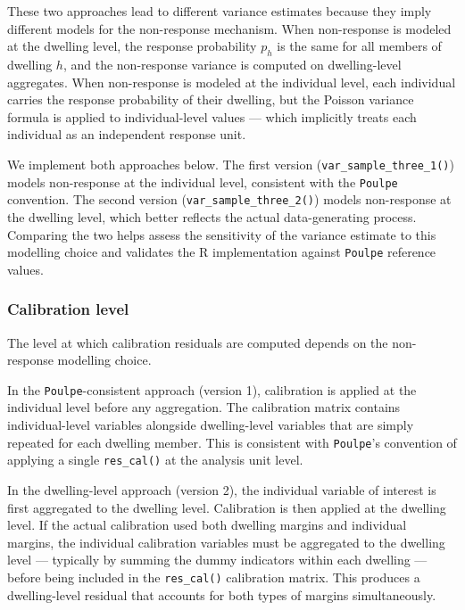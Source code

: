 \documentclass[
]{article}
\begin{document}
These two approaches lead to different variance estimates because they
imply different models for the non-response mechanism. When non-response
is modeled at the dwelling level, the response probability \(p_h\) is
the same for all members of dwelling \(h\), and the non-response
variance is computed on dwelling-level aggregates. When non-response is
modeled at the individual level, each individual carries the response
probability of their dwelling, but the Poisson variance formula is
applied to individual-level values --- which implicitly treats each
individual as an independent response unit.

We implement both approaches below. The first version
(\texttt{var\_sample\_three\_1()}) models non-response at the individual
level, consistent with the \texttt{Poulpe} convention. The second
version (\texttt{var\_sample\_three\_2()}) models non-response at the
dwelling level, which better reflects the actual data-generating
process. Comparing the two helps assess the sensitivity of the variance
estimate to this modelling choice and validates the R implementation
against \texttt{Poulpe} reference values.

\subsubsection{Calibration level}\label{calibration-level}

The level at which calibration residuals are computed depends on the
non-response modelling choice.

In the \texttt{Poulpe}-consistent approach (version 1), calibration is
applied at the individual level before any aggregation. The calibration
matrix contains individual-level variables alongside dwelling-level
variables that are simply repeated for each dwelling member. This is
consistent with \texttt{Poulpe}'s convention of applying a single
\texttt{res\_cal()} at the analysis unit level.

In the dwelling-level approach (version 2), the individual variable of
interest is first aggregated to the dwelling level. Calibration is then
applied at the dwelling level. If the actual calibration used both
dwelling margins and individual margins, the individual calibration
variables must be aggregated to the dwelling level --- typically by
summing the dummy indicators within each dwelling --- before being
included in the \texttt{res\_cal()} calibration matrix. This produces a
dwelling-level residual that accounts for both types of margins
simultaneously.
\end{document}
